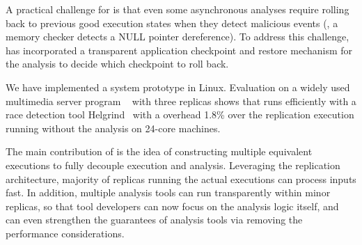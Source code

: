 A practical challenge for \xxx is that even some asynchronous analyses require 
rolling back to previous good execution states when they detect malicious 
events (\eg, a memory checker detects a NULL pointer dereference). To address 
this challenge, \xxx has incorporated a transparent application checkpoint and 
restore mechanism for the analysis to decide which checkpoint to roll back.


We have implemented a \xxx system prototype in Linux. Evaluation on a widely 
used multimedia server program \mediatomb~\cite{mediatomb} with three replicas 
shows that \xxx runs efficiently with a race detection tool 
Helgrind~\cite{valgrind:pldi} with a overhead 1.8\% over the replication 
execution running without the analysis on 24-core machines.







The main contribution of \xxx is the idea of constructing multiple equivalent 
executions to fully decouple execution and analysis. Leveraging the replication 
architecture, majority of replicas running the actual executions can process 
inputs fast. In addition, multiple analysis tools can run transparently within 
minor replicas, so that tool developers can now focus on the analysis logic 
itself, and can even strengthen the guarantees of analysis tools via removing 
the performance considerations.





